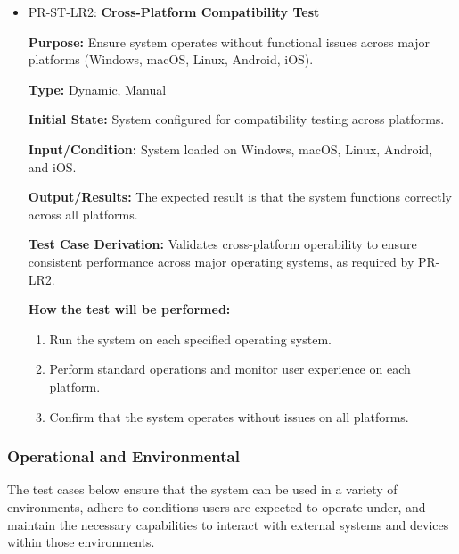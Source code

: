 \documentclass[12pt, titlepage]{article}
\begin{document}
\begin{itemize}
\item PR-ST-LR2: \textbf{Cross-Platform Compatibility Test}
  \begin{mdframed}[linewidth=0.5mm]
      \textbf{Purpose:} Ensure system operates without functional issues across major platforms (Windows, macOS, Linux, Android, iOS). \par
      \textbf{Type:} Dynamic, Manual \par
      \textbf{Initial State:} System configured for compatibility testing across platforms. \par
      \textbf{Input/Condition:} System loaded on Windows, macOS, Linux, Android, and iOS. \par
      \textbf{Output/Results:} The expected result is that the system functions correctly across all platforms. \par
      \textbf{Test Case Derivation:} Validates cross-platform operability to ensure consistent performance across major operating systems, as required by PR-LR2. \par
      \textbf{How the test will be performed:}
      \begin{enumerate}[noitemsep]
        \item Run the system on each specified operating system.
        \item Perform standard operations and monitor user experience on each platform.
        \item Confirm that the system operates without issues on all platforms.
      \end{enumerate}
  \end{mdframed}
\end{itemize}

\subsubsection{Operational and Environmental}

\hspace{2em}The test cases below ensure that the system can be used in a variety of environments,
adhere to conditions users are expected to operate under, and maintain the necessary capabilities
to interact with external systems and devices within those environments.
\end{document}
